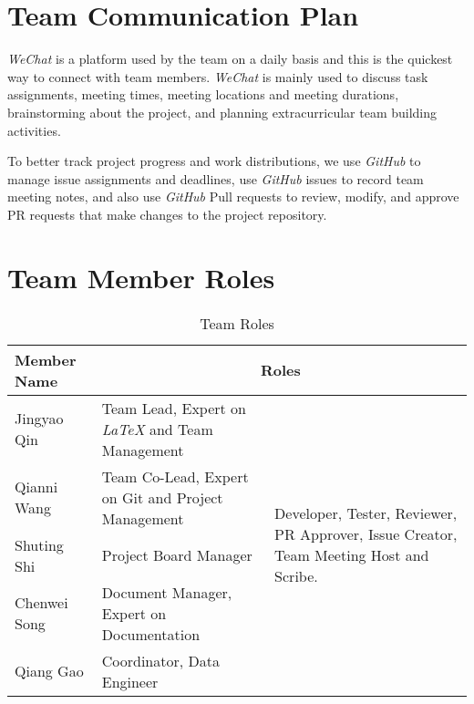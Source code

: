 \documentclass{article}
\begin{document}
\section{Team Communication Plan}
\textit{WeChat} is a platform used by the team on a daily basis and this is the quickest way to connect with team members. \textit{WeChat} is mainly used to discuss task assignments, meeting times, meeting locations and meeting durations, brainstorming about the project, and planning extracurricular team building activities. 

To better track project progress and work distributions, we use \textit{GitHub} to manage issue assignments and deadlines, use \textit{GitHub} issues to record team meeting notes, and also use \textit{GitHub} Pull requests to review, modify, and approve PR requests that make changes to the project repository.

\section{Team Member Roles}

\begin{table}[ht]
  \centering
  \begin{tabular}{|p{3cm}|p{6cm}|p{3cm}|}
    \hline
    \textbf{Member Name} & \multicolumn{2}{c|}{\textbf{Roles}} \\
    \hline
    Jingyao Qin & Team Lead, Expert on \textit{LaTeX} and Team Management & \multirow{5}{*}{\parbox{3cm}{Developer, Tester, Reviewer, PR Approver, Issue Creator, Team Meeting Host and Scribe.}}\\
    \cline{1-2} 
    Qianni Wang & Team Co-Lead, Expert on Git and Project Management & \\
    \cline{1-2} 
    Shuting Shi & Project Board Manager & \\
    \cline{1-2}
    Chenwei Song & Document Manager, Expert on Documentation & \\
    \cline{1-2} 
    Qiang Gao & Coordinator, Data Engineer & \\
    \hline
  \end{tabular}
  \caption{Team Roles}
\end{table}
\end{document}
